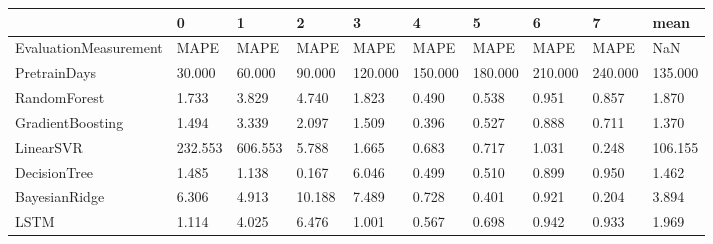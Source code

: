 \begin{tabular}{llllllllll}
\toprule
{} &       0 &       1 &      2 &       3 &       4 &       5 &       6 &       7 &    mean \\
\midrule
EvaluationMeasurement &    MAPE &    MAPE &   MAPE &    MAPE &    MAPE &    MAPE &    MAPE &    MAPE &     NaN \\
PretrainDays          &  30.000 &  60.000 & 90.000 & 120.000 & 150.000 & 180.000 & 210.000 & 240.000 & 135.000 \\
RandomForest          &   1.733 &   3.829 &  4.740 &   1.823 &   0.490 &   0.538 &   0.951 &   0.857 &   1.870 \\
GradientBoosting      &   1.494 &   3.339 &  2.097 &   1.509 &   0.396 &   0.527 &   0.888 &   0.711 &   1.370 \\
LinearSVR             & 232.553 & 606.553 &  5.788 &   1.665 &   0.683 &   0.717 &   1.031 &   0.248 & 106.155 \\
DecisionTree          &   1.485 &   1.138 &  0.167 &   6.046 &   0.499 &   0.510 &   0.899 &   0.950 &   1.462 \\
BayesianRidge         &   6.306 &   4.913 & 10.188 &   7.489 &   0.728 &   0.401 &   0.921 &   0.204 &   3.894 \\
LSTM                  &   1.114 &   4.025 &  6.476 &   1.001 &   0.567 &   0.698 &   0.942 &   0.933 &   1.969 \\
\bottomrule
\end{tabular}
